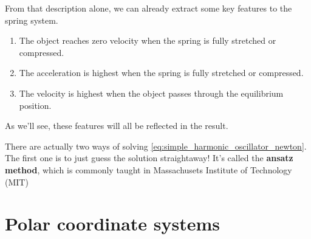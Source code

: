 From that description alone, we can already extract some key features to the spring system.
\begin{enumerate}
	\item The object reaches zero velocity when the spring is fully stretched or compressed.
	\item The acceleration is highest when the spring is fully stretched or compressed.
	\item The velocity is highest when the object passes through the equilibrium position. 
\end{enumerate}
As we'll see, these features will all be reflected in the result.

There are actually two ways of solving \cref{eq:simple_harmonic_oscillator_newton}. The first one is to just guess the solution straightaway! It's called the \textbf{ansatz method}, which is commonly taught in Massachusets Institute of Technology (MIT) 

\section{Polar coordinate systems}
